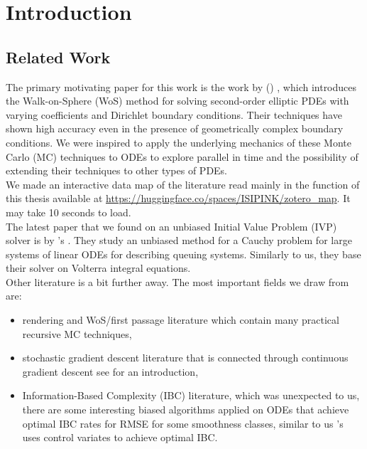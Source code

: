 \documentclass[a4paper,12pt]{article}
\begin{document}


\newpage
\tableofcontents
\newpage

\begin{abstract}
    
\end{abstract}


\section{Introduction}

\subsection{Related Work}
The primary motivating paper for this work is the work
by \citeauthor{sawhney_grid-free_2022}
(\citeyear{sawhney_grid-free_2022}) \cite{sawhney_grid-free_2022},
which introduces the Walk-on-Sphere (WoS) method for solving second-order
elliptic PDEs with varying coefficients and Dirichlet boundary conditions.
Their techniques have shown high accuracy even in the presence of geometrically
complex boundary conditions. We were inspired to apply the underlying
mechanics of these Monte Carlo (MC) techniques to ODEs to explore
parallel in time and the possibility of extending their techniques
to other types of PDEs. \\

We made an interactive data map of the literature read
mainly in the function of this thesis available at
\url{https://huggingface.co/spaces/ISIPINK/zotero_map}.
It may take 10 seconds to load. \\

The latest paper that we found on an unbiased Initial Value Problem (IVP) solver is by
\citeauthor{ermakov_monte_2021}'s \citeyear{ermakov_monte_2021}
\cite{ermakov_monte_2021}.  They study an unbiased method for
a Cauchy problem for large systems of linear ODEs
for describing queuing systems. Similarly to us, they
base their solver on Volterra integral equations.\\

Other literature is a bit further away.
The most important fields we draw from are:

\begin{itemize}
    \item rendering and WoS/first passage literature
          which contain many practical recursive
          MC techniques,

    \item  stochastic gradient descent literature
          that is connected through continuous gradient descent
          see \cite{huang_hybrid_2017} for an introduction,

    \item  Information-Based Complexity (IBC) literature, which was
          unexpected to us, there are some interesting
          biased algorithms applied on ODEs that achieve optimal
          IBC rates for RMSE for some smoothness classes, similar to us
          \citeauthor{daun_randomized_2011}'s \citeyear{daun_randomized_2011}
          \cite{daun_randomized_2011} uses control variates
          to achieve optimal IBC.
\end{itemize}
\end{document}
